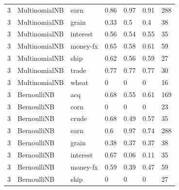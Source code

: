 \documentclass{article}
\begin{document}
\begin{table}[h]
\begin{tabular}{lllllll}
3             & MultinomialNB          & earn            & 0.86               & 0.97            & 0.91              & 288              \\
3             & MultinomialNB          & grain           & 0.33               & 0.5             & 0.4               & 38               \\
3             & MultinomialNB          & interest        & 0.56               & 0.54            & 0.55              & 35               \\
3             & MultinomialNB          & money-fx        & 0.65               & 0.58            & 0.61              & 59               \\
3             & MultinomialNB          & ship            & 0.62               & 0.56            & 0.59              & 27               \\
3             & MultinomialNB          & trade           & 0.77               & 0.77            & 0.77              & 30               \\
3             & MultinomialNB          & wheat           & 0                  & 0               & 0                 & 16               \\
3             & BernoulliNB            & acq             & 0.68               & 0.55            & 0.61              & 169              \\
3             & BernoulliNB            & corn            & 0                  & 0               & 0                 & 23               \\
3             & BernoulliNB            & crude           & 0.68               & 0.49            & 0.57              & 35               \\
3             & BernoulliNB            & earn            & 0.6                & 0.97            & 0.74              & 288              \\
3             & BernoulliNB            & grain           & 0.38               & 0.37            & 0.37              & 38               \\
3             & BernoulliNB            & interest        & 0.67               & 0.06            & 0.11              & 35               \\
3             & BernoulliNB            & money-fx        & 0.59               & 0.39            & 0.47              & 59               \\
3             & BernoulliNB            & ship            & 0                  & 0               & 0                 & 27               \\

\end{tabular}
\end{table}
\end{document}
